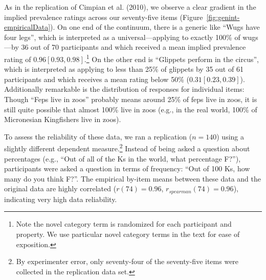 \documentclass[floatsintext,doc]{apa6}
\let\rmarkdownfootnote\footnote%
\def\footnote{\protect\rmarkdownfootnote}
\begin{document}
As in the replication of Cimpian et al. (2010), we observe a clear gradient in the implied prevalence ratings across our seventy-five items (Figure~\ref{fig:genint-empiricalData}).
On one end of the continuum, there is a generic like \enquote{Wugs have four legs}, which is interpreted as a universal---applying to exactly 100\% of wugs---by 36 out of 70 participants and which received a mean implied prevalence rating of \(0.96 [0.93, 0.98]\).\footnote{Note the novel category term is randomized for each participant and property.
  We use particular novel category terms in the text for ease of exposition.}
On the other end is \enquote{Glippets perform in the circus}, which is interpreted as applying to less than 25\% of glippets by 35 out of 61 participants and which receives a mean rating below 50\% (\(0.31 [0.23, 0.39]\)).
Additionally remarkable is the distribution of responses for individual items: Though \enquote{Feps live in zoos} probably means around 25\% of feps live in zoos, it is still quite possible that almost 100\% live in zoos (e.g., in the real world, 100\% of Micronesian Kingfishers live in zoos).

To assess the reliability of these data, we ran a replication (\(n=140\)) using a slightly different dependent measure.\footnote{By experimenter error, only seventy-four of the seventy-five items were collected in the replication data set.}
Instead of being asked a question about percentages (e.g., \enquote{Out of all of the Ks in the world, what percentage F?}), participants were asked a question in terms of frequency: \enquote{Out of 100 Ks, how many do you think F?}.
The empirical by-item means between these data and the original data are highly correlated (\(r(74) = 0.96\), \(r_{spearman}(74)= 0.96\)), indicating very high data reliability.
\end{document}
